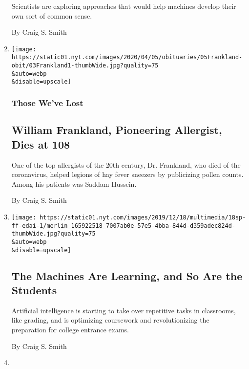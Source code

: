 \begin{enumerate}
  Scientists are exploring approaches that would help machines develop
  their own sort of common sense.

  By Craig S. Smith
\item
  \href{/2020/04/03/science/william-frankland-dead-coronavirus.html}{}

  \texttt{[image: https://static01.nyt.com/images/2020/04/05/obituaries/05Frankland-obit/03Frankland1-thumbWide.jpg?quality=75\\\&auto=webp\\\&disable=upscale]}

  \hypertarget{those-weve-lost}{%
  \subsubsection{Those We've Lost}\label{those-weve-lost}}

  \hypertarget{william-frankland-pioneering-allergist-dies-at-108}{%
  \subsection{William Frankland, Pioneering Allergist, Dies at
  108}\label{william-frankland-pioneering-allergist-dies-at-108}}

  One of the top allergists of the 20th century, Dr. Frankland, who died
  of the coronavirus, helped legions of hay fever sneezers by
  publicizing pollen counts. Among his patients was Saddam Hussein.

  By Craig S. Smith
\item
  \href{/2019/12/18/education/artificial-intelligence-tutors-teachers.html}{}

  \texttt{[image: https://static01.nyt.com/images/2019/12/18/multimedia/18sp-ff-edai-1/merlin\_165922518\_7007ab0e-57e5-4bba-844d-d359adec824d-thumbWide.jpg?quality=75\\\&auto=webp\\\&disable=upscale]}

  \hypertarget{the-machines-are-learning-and-so-are-the-students}{%
  \subsection{The Machines Are Learning, and So Are the
  Students}\label{the-machines-are-learning-and-so-are-the-students}}

  Artificial intelligence is starting to take over repetitive tasks in
  classrooms, like grading, and is optimizing coursework and
  revolutionizing the preparation for college entrance exams.

  By Craig S. Smith
\item
  \href{/2019/11/19/technology/artificial-intelligence-bias.html}{}


\end{enumerate}
